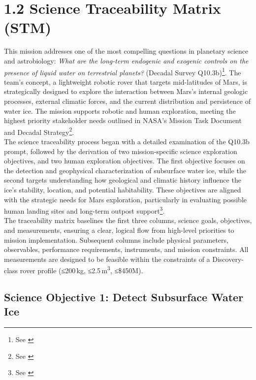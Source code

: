 \section*{1.2 Science Traceability Matrix (STM)}

This mission addresses one of the most compelling questions in planetary science and astrobiology: \textit{What are the long-term endogenic and exogenic controls on the presence of liquid water on terrestrial planets?} (Decadal Survey Q10.3b)\footnote{See \cite{nrc_2022_decadal}}. The team's concept, a lightweight robotic rover that targets mid-latitudes of Mars, is strategically designed to explore the interaction between Mars's internal geologic processes, external climatic forces, and the current distribution and persistence of water ice. The mission supports robotic and human exploration, meeting the highest priority stakeholder needs outlined in NASA’s Mission Task Document and Decadal Strategy\footnote{See \cite{lspace_stm_module, mepag_goals}}. \\

The science traceability process began with a detailed examination of the Q10.3b prompt, followed by the derivation of two mission-specific science exploration objectives, and two human exploration objectives. The first objective focuses on the detection and geophysical characterization of subsurface water ice, while the second targets understanding how geological and climatic history influence the ice’s stability, location, and potential habitability. These objectives are aligned with the strategic needs for Mars exploration, particularly in evaluating possible human landing sites and long-term outpost support\footnote{See \cite{nasa_m2m_objectives}}. \\

The traceability matrix baselines the first three columns, science goals, objectives, and measurements, ensuring a clear, logical flow from high-level priorities to mission implementation. Subsequent columns include physical parameters, observables, performance requirements, instruments, and mission constraints. All measurements are designed to be feasible within the constraints of a Discovery-class rover profile (≤200 kg, ≤2.5 m\textsuperscript{3}, ≤\$450M). \\

\subsection*{Science Objective 1: Detect Subsurface Water Ice}

